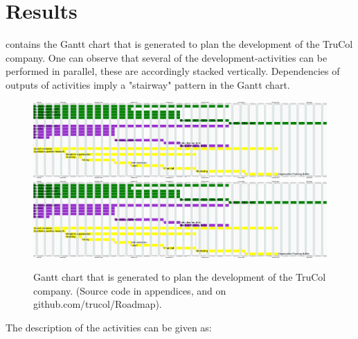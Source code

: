 \section{Results}\label{sec:results}
%
 contains the Gantt chart that is generated to plan the development of the TruCol company. One can observe that several of the development-activities can be performed in parallel, these are accordingly stacked vertically. Dependencies of outputs of activities imply a "stairway" pattern in the Gantt chart. 
\clearpage
\begin{figure}
\hspace*{-0cm}   
	\ifx\homepath\overleafhome
		\includegraphics[width=775pt]{images/created.png}
	\else
		\includegraphics[width=775pt]{latex/images/created.png}
	\fi
    \caption{Gantt chart that is generated to plan the development of the TruCol company. (Source code in appendices, and on github.com/trucol/Roadmap).}
    \label{fig:gantt}
\end{figure}
\clearpage
The description of the activities can be given as:
